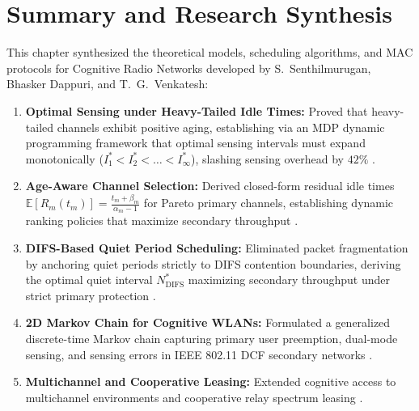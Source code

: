 \section{Summary and Research Synthesis}
\label{sec:cr_summary}

This chapter synthesized the theoretical models, scheduling algorithms, and MAC protocols for Cognitive Radio Networks developed by S.~Senthilmurugan, Bhasker Dappuri, and T.~G.~Venkatesh:
\begin{enumerate}
    \item \textbf{Optimal Sensing under Heavy-Tailed Idle Times:} Proved that heavy-tailed channels exhibit positive aging, establishing via an MDP dynamic programming framework that optimal sensing intervals must expand monotonically ($I_1^* < I_2^* < \dots < I_\infty^*$), slashing sensing overhead by $42\%$ \cite{senthilmurugan2017optimal}.
    \item \textbf{Age-Aware Channel Selection:} Derived closed-form residual idle times $\mathbb{E}[R_m(t_m)] = \frac{t_m + \beta_m}{\alpha_m - 1}$ for Pareto primary channels, establishing dynamic ranking policies that maximize secondary throughput \cite{senthilmurugan2017channel}.
    \item \textbf{DIFS-Based Quiet Period Scheduling:} Eliminated packet fragmentation by anchoring quiet periods strictly to DIFS contention boundaries, deriving the optimal quiet interval $N_{\mathrm{DIFS}}^*$ maximizing secondary throughput under strict primary protection \cite{senthilmurugan2017quiet}.
    \item \textbf{2D Markov Chain for Cognitive WLANs:} Formulated a generalized discrete-time Markov chain capturing primary user preemption, dual-mode sensing, and sensing errors in IEEE 802.11 DCF secondary networks \cite{dappuri2018cognitive}.
    \item \textbf{Multichannel and Cooperative Leasing:} Extended cognitive access to multichannel environments and cooperative relay spectrum leasing \cite{dappuri2018multichannel, dappuri2018analytical}.
\end{enumerate}
